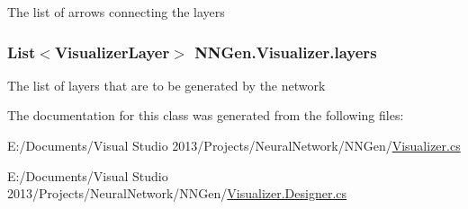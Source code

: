 The list of arrows connecting the layers 

\hypertarget{class_n_n_gen_1_1_visualizer_a4a5a494c2d58e28febb4a807979e98c1}{}
\subsubsection[{layers}]{\setlength{\rightskip}{0pt plus 5cm}List$<${\bf Visualizer\+Layer}$>$ N\+N\+Gen.\+Visualizer.\+layers\hspace{0.3cm}{\ttfamily [get]}}\label{class_n_n_gen_1_1_visualizer_a4a5a494c2d58e28febb4a807979e98c1}


The list of layers that are to be generated by the network 



The documentation for this class was generated from the following files\+:\begin{DoxyCompactItemize}
\item 
E\+:/\+Documents/\+Visual Studio 2013/\+Projects/\+Neural\+Network/\+N\+N\+Gen/\hyperlink{_visualizer_8cs}{Visualizer.\+cs}\item 
E\+:/\+Documents/\+Visual Studio 2013/\+Projects/\+Neural\+Network/\+N\+N\+Gen/\hyperlink{_visualizer_8_designer_8cs}{Visualizer.\+Designer.\+cs}\end{DoxyCompactItemize}
